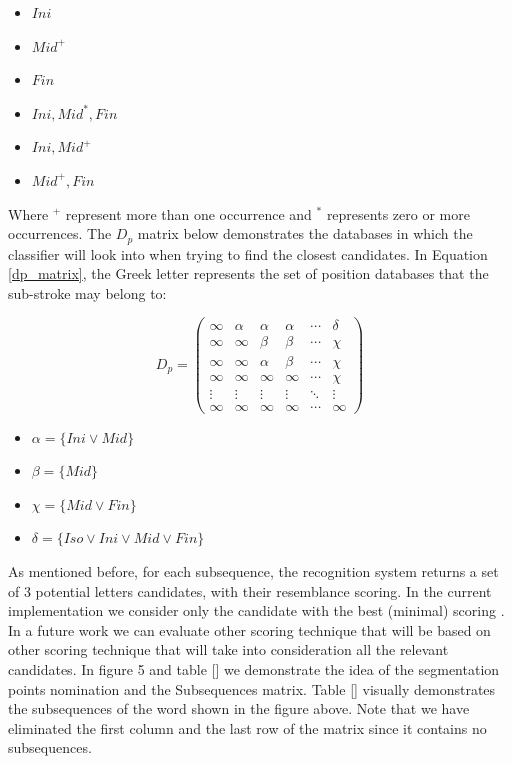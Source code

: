 \documentclass[12pt,journal,compsoc]{IEEEtran}
\begin{document}
\begin{multicols}{2}
\begin{itemize}
    \item $Ini$
    \item $Mid^{+}$
    \item $Fin$
    \item $Ini,Mid^{*},Fin$
    \item $Ini,Mid^{+}$
    \item $Mid^{+},Fin$
\end{itemize}
\end{multicols}
Where $^+$ represent more than one occurrence and $^*$ represents zero or more occurrences. The $D_p$ matrix below demonstrates the databases in which the classifier will look into when trying to find the closest candidates. In Equation \ref{dp_matrix}, the Greek letter represents the set of position databases that the sub-stroke may belong to:

\begin{equation}
D_{p}=
\left( \begin{array}{cccccc}
\infty & \alpha & \alpha & \alpha & \cdots & \delta \\
\infty & \infty & \beta & \beta & \cdots & \chi \\
\infty & \infty & \alpha & \beta & \cdots & \chi \\
\infty & \infty & \infty & \infty & \cdots & \chi \\
\vdots & \vdots & \vdots & \vdots & \ddots & \vdots \\
\infty & \infty & \infty & \infty & \cdots & \infty \end{array} \right)
\label{dp_matrix}
\end{equation}

\begin{itemize}
    \item[] $\alpha=\{Ini \vee Mid\}$
    \item[] $\beta=\{Mid\}$
    \item[] $\chi=\{Mid \vee Fin\}$
    \item[] $\delta=\{Iso \vee Ini \vee Mid \vee Fin\}$
\end{itemize}

As mentioned before, for each subsequence, the recognition system returns a set of 3 potential letters candidates, with their resemblance scoring. In the current implementation we consider only the candidate with the best (minimal) scoring . In a future work we can evaluate other scoring technique that will be based on other scoring technique that will take into consideration all the relevant candidates.
In figure 5 and table [] we demonstrate the idea of the segmentation points nomination and the Subsequences matrix.
Table [] visually demonstrates the subsequences of the word shown in the figure above. Note that we have eliminated the first column and the last row of the matrix since it contains no subsequences.
\end{document}
